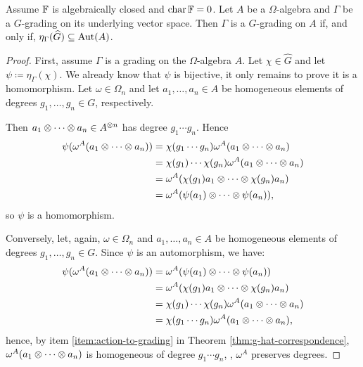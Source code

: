 \begin{prop}\label{prop:g-hat-Aut-A}
    Assume $\mathbb{F}$ is algebraically closed and $\operatorname{char} \mathbb{F} = 0$. 
    Let $A$ be a $\Omega$-algebra and $\Gamma$ be a $G$-grading on its underlying vector space. 
    Then $\Gamma$ is a $G$-grading on $A$ if, and only if, $\eta_\Gamma(\widehat G) \subseteq \operatorname{Aut}(A)$.
\end{prop}

\begin{proof}
    First, assume $\Gamma$ is a grading on the $\Omega$-algebra $A$.
    Let $\chi \in \widehat G$ and let $\psi \coloneqq \eta_\Gamma(\chi)$. 
    We already know that $\psi$ is bijective, it only remains to prove it is a homomorphism. 
    Let $\omega \in \Omega_n$ and let $a_1, \ldots, a_n \in A$ be homogeneous elements of degrees $g_1, \ldots, g_n \in G$, respectively.
    
    Then $a_1\otimes \cdots \otimes a_n \in A^{\otimes n}$ has degree $g_1 \cdots g_n$. Hence
    \begin{align*}
        \psi(\omega^A(a_1\otimes \cdots \otimes a_n)) &= \chi(g_1 \cdots g_n) \omega^A(a_1\otimes \cdots \otimes a_n)\\
        &=\chi(g_1) \cdots \chi(g_n) \omega^A(a_1\otimes \cdots \otimes a_n)\\
        &= \omega^A(\chi(g_1)a_1\otimes \cdots \otimes \chi(g_n)a_n)\\
        &= \omega^A(\psi(a_1)\otimes \cdots \otimes \psi(a_n)),
    \end{align*}
    so $\psi$ is a homomorphism.
    
    Conversely, let, again, $\omega \in \Omega_n$ and $a_1, \ldots, a_n \in A$ be homogeneous elements of degrees $g_1, \ldots, g_n \in G$. 
    Since $\psi$ is an automorphism, we have:
    \begin{align*}
        \psi(\omega^A(a_1\otimes \cdots \otimes a_n)) &= \omega^A(\psi(a_1)\otimes \cdots \otimes \psi(a_n))\\
        &= \omega^A(\chi(g_1)a_1\otimes \cdots \otimes \chi(g_n)a_n)\\
        &=\chi(g_1) \cdots \chi(g_n) \omega^A(a_1\otimes \cdots \otimes a_n)\\
        &=\chi(g_1 \cdots g_n) \omega^A(a_1\otimes \cdots \otimes a_n),
    \end{align*}
    hence, by item \eqref{item:action-to-grading} in Theorem \ref{thm:g-hat-correspondence}, $\omega^A(a_1\otimes \cdots \otimes a_n)$ is homogeneous of degree $g_1 \cdots g_n$, \ie, $\omega^A$ preserves degrees.
\end{proof}

